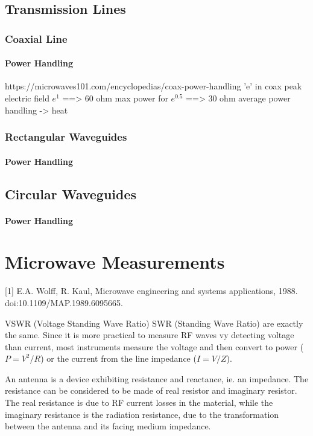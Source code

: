 \subsection{Transmission Lines}
\subsubsection{Coaxial Line}
\paragraph{Power Handling}
https://microwaves101.com/encyclopedias/coax-power-handling
'e' in coax
peak electric field $e^1$  ==> 60 ohm
max power for $ e^0.5$  ==> 30 ohm
average power handling -> heat 
\subsubsection{Rectangular Waveguides}
\paragraph{Power Handling}

\subsection{Circular Waveguides}
\paragraph{Power Handling}

\section{Microwave Measurements}
[1] E.A. Wolff, R. Kaul, Microwave engineering and systems applications, 1988. doi:10.1109/MAP.1989.6095665.

VSWR (Voltage Standing Wave Ratio)
SWR (Standing Wave Ratio) are exactly the same. Since it is more practical to measure RF waves vy detecting voltage than current, most instruments measure the voltage and then convert to power ($P=V^2/R$) or the current from the line impedance ($I=V/Z$).

An antenna is a device exhibiting resistance and reactance, ie. an impedance. The resistance can be considered to be made of real resistor and imaginary resistor. The real resistance is due to RF current losses in the material, while the imaginary resistance is the radiation resistance, due to the transformation between the antenna and its facing medium impedance. 

